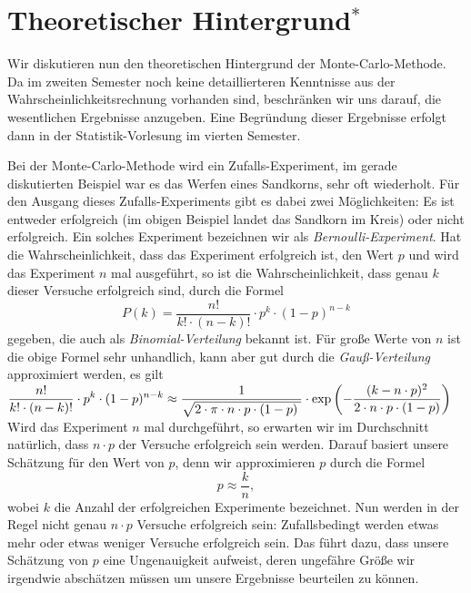 \begin{center}
\colorbox{red}{\colorbox{orange}{}}
\end{center}

\section[Theory]{Theoretischer Hintergrund$^*$}
Wir diskutieren nun den theoretischen Hintergrund der Monte-Carlo-Methode.  Da im zweiten Semester noch
keine detaillierteren Kenntnisse aus der Wahrscheinlichkeits\-rechnung vorhanden sind, beschr\"anken wir
uns darauf, die wesentlichen Ergebnisse anzugeben.  Eine Begr\"undung dieser Ergebnisse erfolgt dann
in der Statistik-Vorlesung im vierten Semester. 

Bei der Monte-Carlo-Methode wird ein Zufalls-Experiment, im gerade diskutierten Beispiel war es das Werfen
eines Sandkorns, sehr oft wiederholt.  F\"ur den Ausgang dieses Zufalls-Experiments gibt es dabei zwei
M\"oglichkeiten:  Es ist ent\-weder erfolgreich (im obigen Beispiel landet das Sandkorn im Kreis) oder nicht
erfolgreich.  Ein solches Experiment bezeichnen wir als \emph{Bernoulli-Experiment}.
 Hat die Wahrscheinlichkeit, dass das Experiment erfolgreich ist, den Wert $p$ und wird das
Experiment $n$ mal ausgef\"uhrt, so ist die Wahrscheinlichkeit, dass genau $k$ dieser Versuche erfolgreich sind,
durch die Formel
\[ P(k) = \frac{n!}{k! \cdot (n-k)!} \cdot p^k \cdot (1-p)^{n-k} \]
gegeben, die auch als \emph{Binomial-Verteilung} bekannt ist.  F\"ur gro{\ss}e Werte von $n$ ist die obige Formel
sehr unhandlich, kann aber gut durch die \emph{Gau{\ss}-Verteilung} approximiert werden, es gilt
\\[0.2cm]
\hspace*{0.8cm}
$\displaystyle\frac{n!}{k! \cdot (n-k)!} \cdot p^k \cdot (1-p)^{n-k} \approx  
   \frac{1}{\sqrt{2\cdot \pi \cdot n \cdot p \cdot (1-p)\;}} \cdot 
   \exp\left(-\frac{(k - n \cdot p)^2}{2 \cdot n \cdot p \cdot (1 - p)}\right)
$
\\[0.2cm]
Wird das Experiment $n$ mal durchgef\"uhrt, so erwarten wir im Durchschnitt nat\"urlich, dass $n \cdot p$ der
Versuche erfolgreich sein werden.  Darauf basiert unsere Sch\"atzung f\"ur den Wert von $p$, denn wir approximieren
$p$ durch die Formel
\[ p \approx \frac{k}{n}, \]
wobei $k$ die Anzahl der erfolgreichen Experimente bezeichnet.  Nun werden in der Regel nicht genau $n \cdot p$
Versuche erfolgreich sein: Zufallsbedingt werden etwas mehr oder etwas weniger Versuche
erfolgreich sein.  Das f\"uhrt dazu, dass unsere Sch\"atzung von $p$ eine Ungenauigkeit aufweist, deren ungef\"ahre
Gr\"o{\ss}e wir irgendwie absch\"atzen m\"ussen um unsere Ergebnisse beurteilen zu k\"onnen.

